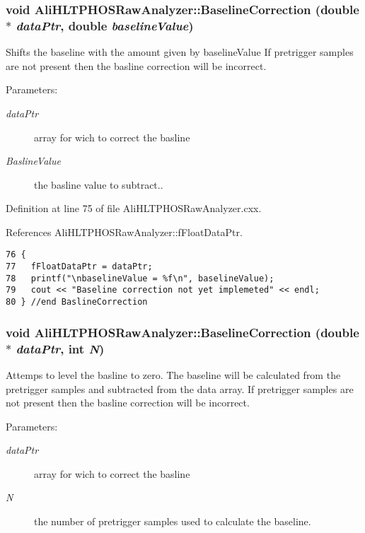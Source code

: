 \subsubsection{\setlength{\rightskip}{0pt plus 5cm}void Ali\-HLTPHOSRaw\-Analyzer::Baseline\-Correction (double $\ast$ {\em data\-Ptr}, double {\em baseline\-Value})\hspace{0.3cm}{\tt  [inherited]}}\label{classAliHLTPHOSRawAnalyzer_AliHLTPHOSRawAnalyzerPeakFindera8}


Shifts the baseline with the amount given by baseline\-Value If pretrigger samples are not present then the basline correction will be incorrect. \begin{Desc}
\item[Parameters:]
\begin{description}
\item[{\em data\-Ptr}]array for wich to correct the basline \item[{\em Basline\-Value}]the basline value to subtract.. \end{description}
\end{Desc}


Definition at line 75 of file Ali\-HLTPHOSRaw\-Analyzer.cxx.

References Ali\-HLTPHOSRaw\-Analyzer::f\-Float\-Data\-Ptr.

\footnotesize\begin{verbatim}76 {
77   fFloatDataPtr = dataPtr;   
78   printf("\nbaselineValue = %f\n", baselineValue);
79   cout << "Baseline correction not yet implemeted" << endl;
80 } //end BaslineCorrection
\end{verbatim}\normalsize 


\subsubsection{\setlength{\rightskip}{0pt plus 5cm}void Ali\-HLTPHOSRaw\-Analyzer::Baseline\-Correction (double $\ast$ {\em data\-Ptr}, int {\em N})\hspace{0.3cm}{\tt  [inherited]}}\label{classAliHLTPHOSRawAnalyzer_AliHLTPHOSRawAnalyzerPeakFindera7}


Attemps to level the basline to zero. The baseline will be calculated from the pretrigger samples and subtracted from the data array. If pretrigger samples are not present then the basline correction will be incorrect. \begin{Desc}
\item[Parameters:]
\begin{description}
\item[{\em data\-Ptr}]array for wich to correct the basline \item[{\em N}]the number of pretrigger samples used to calculate the baseline. \end{description}
\end{Desc}


